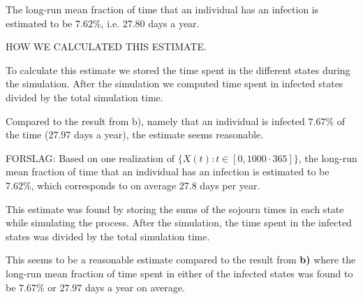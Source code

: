 The long-run mean fraction of time that an individual has an infection is estimated to be $7.62\%$, i.e. 27.80 days a year.  

HOW WE CALCULATED THIS ESTIMATE.

To calculate this estimate we stored the time spent in the different states during the simulation. After the simulation we computed time spent in infected states divided by the total simulation time. 

Compared to the result from b), namely that an individual is infected $7.67\%$ of the time  (27.97 days a year), the estimate seems reasonable. 


FORSLAG: Based on one realization of $\{X(t): t \in [0,1000\cdot365]\}$, the long-run mean fraction of time that an individual has an infection is estimated to be $7.62\%$, which corresponds to on average $27.8$ days per year. 

This estimate was found by storing the sums of the sojourn times in each state while simulating the process. After the simulation, the time spent in the infected states was divided by the total simulation time. 

This seems to be a reasonable estimate compared to the result from \textbf{b)} where the long-run mean fraction of time spent in either of the infected states was found to be $7.67\%$ or $27.97$ days a year on average.

